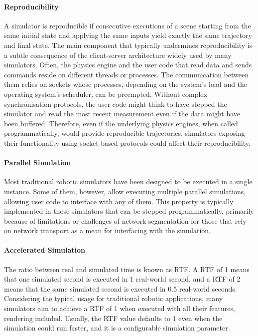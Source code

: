 \paragraph{Reproducibility}

A simulator is reproducible if consecutive executions of a scene starting from the same initial state and applying the same inputs yield exactly the same trajectory and final state.
The main component that typically undermines reproducibility is a subtle consequence of the client-server architecture widely used by many simulators.
Often, the physics engine and the user code that read data and sends commands reside on different threads or processes.
The communication between them relies on sockets
whose processes, depending on the system's load and  the operating system's scheduler, can be preempted.
Without complex synchronisation protocols, the user code might think to have stepped the simulator and read the most recent measurement even if the data might have been buffered.
Therefore, even if the underlying physics engines, when called programmatically, would provide reproducible trajectories, simulators exposing their functionality using socket-based protocols could affect their reproducibility.

\paragraph{Parallel Simulation}

Most traditional robotic simulators have been designed to be executed in a single instance.
Some of them, however, allow executing multiple parallel simulations, allowing user code to interface with any of them.
This property is typically implemented in those simulators that can be stepped programmatically, primarily because of limitations or challenges of network segmentation for those that rely on network transport as a mean for interfacing with the simulation.

\paragraph{Accelerated Simulation}

The ratio between real and simulated time is known as \ac{RTF}.
A \ac{RTF} of 1 means that one simulated second is executed in $1$ real-world second, and a \ac{RTF} of 2 means that the same simulated second is executed in $0.5$ real-world seconds.
Considering the typical usage for traditional robotic applications, many simulators aim to achieve a \ac{RTF} of 1 when executed with all their features, rendering included.
Usually, the \ac{RTF} value defaults to 1 even when the simulation could run faster, and it is a configurable simulation parameter.

